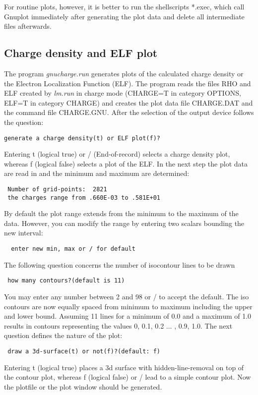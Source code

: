 \documentclass[aps,twocolumn,a4]{revtex4}
\begin{document}
For routine plots, however, it is better to run the shellscripts *.exec,
which call Gnuplot immediately after generating the plot data and delete
all intermediate files afterwards.

\subsection {Charge density and ELF plot}
\label{charplot}
The program {\it gnucharge.run} generates plots of the
calculated charge density or the Electron Localization Function (ELF).
The program reads the files RHO and ELF created by {\it lm.run} in charge mode
(CHARGE=T in category OPTIONS, ELF=T in category CHARGE) and creates the plot
data file CHARGE.DAT and the command
file CHARGE.GNU.
After the selection of the output device follows the question:
\begin{verbatim}
generate a charge density(t) or ELF plot(f)?
\end{verbatim}
Entering t (logical true) or / (End-of-record) selects a charge density plot,
whereas f (logical false) selects a plot of the ELF.
In the next step the plot data are read in and the minimum and maximum are
determined:
\begin{verbatim}
 Number of grid-points:  2821
 the charges range from .660E-03 to .581E+01
\end{verbatim}
By default the plot range extends from the minimum to the maximum of the data.
However, you can modify the range by entering two scalars bounding the
new interval:
\begin{verbatim}
  enter new min, max or / for default
\end{verbatim}
The following question concerns the number of isocontour lines to be drawn
\begin{verbatim}
 how many contours?(default is 11)
\end{verbatim}
You may enter any number between 2 and 98 or / to accept the default.
The iso contours are now equally spaced from minimum to maximum including
the upper and lower bound. Assuming 11 lines for a minimum of 0.0 and a maximum
of 1.0 results in contours representing the values 0, 0.1, 0.2 ... , 0.9, 1.0.
The next question defines the nature of the plot:
\begin{verbatim}
 draw a 3d-surface(t) or not(f)?(default: f)
\end{verbatim}
Entering t (logical true) places a 3d surface with hidden-line-removal on top
of the contour plot, whereas f (logical false) or / lead to a simple
contour plot.
Now the plotfile or the plot window should be generated.\\
\end{document}
